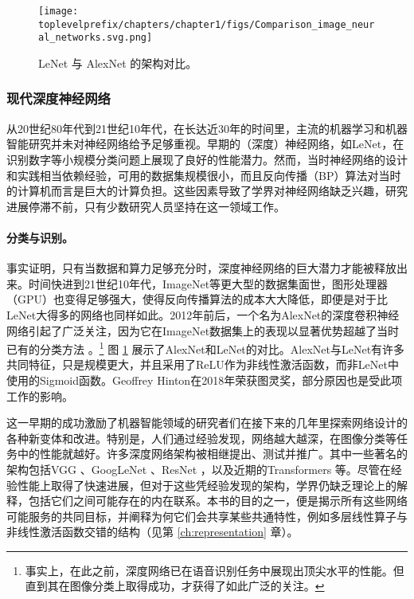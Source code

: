 \documentclass[../../book-main_zh.tex]{subfiles}
\begin{document}
\begin{figure}
    \centering
    \texttt{[image: \\toplevelprefix/chapters/chapter1/figs/Comparison\_image\_neural\_networks.svg.png]}
    \caption{LeNet \cite{LeCun-1989} 与 AlexNet \cite{krizhevsky2012imagenet} 的架构对比。}
    \label{fig:LeNet-AlexNet}
\end{figure}


\subsubsection{现代深度神经网络}
从20世纪80年代到21世纪10年代，在长达近30年的时间里，主流的机器学习和机器智能研究并未对神经网络给予足够重视。早期的（深度）神经网络，如LeNet，在识别数字等小规模分类问题上展现了良好的性能潜力。然而，当时神经网络的设计和实践相当依赖经验，可用的数据集规模很小，而且反向传播（BP）算法对当时的计算机而言是巨大的计算负担。这些因素导致了学界对神经网络缺乏兴趣，研究进展停滞不前，只有少数研究人员坚持在这一领域工作。

\paragraph{分类与识别。}
事实证明，只有当数据和算力足够充分时，深度神经网络的巨大潜力才能被释放出来。时间快进到21世纪10年代，ImageNet等更大型的数据集面世，图形处理器（GPU）也变得足够强大，使得反向传播算法的成本大大降低，即便是对于比LeNet大得多的网络也同样如此。2012年前后，一个名为AlexNet的深度卷积神经网络引起了广泛关注，因为它在ImageNet数据集上的表现以显著优势超越了当时已有的分类方法 \cite{krizhevsky2012imagenet}。\footnote{事实上，在此之前，深度网络已在语音识别任务中展现出顶尖水平的性能。但直到其在图像分类上取得成功，才获得了如此广泛的关注。} 图 \ref{fig:LeNet-AlexNet} 展示了AlexNet和LeNet的对比。AlexNet与LeNet有许多共同特征，只是规模更大，并且采用了ReLU作为非线性激活函数，而非LeNet中使用的Sigmoid函数。Geoffrey Hinton在2018年荣获图灵奖，部分原因也是受此项工作的影响。

这一早期的成功激励了机器智能领域的研究者们在接下来的几年里探索网络设计的各种新变体和改进。特别是，人们通过经验发现，网络越大越深，在图像分类等任务中的性能就越好。许多深度网络架构被相继提出、测试并推广。其中一些著名的架构包括VGG \cite{Simonyan15}、GoogLeNet \cite{Szegedy2014GoingDW}、ResNet \cite{He2016-lc}，以及近期的Transformers \cite{vaswani2017attention} 等。尽管在经验性能上取得了快速进展，但对于这些凭经验发现的架构，学界仍缺乏理论上的解释，包括它们之间可能存在的内在联系。本书的目的之一，便是揭示所有这些网络可能服务的共同目标，并阐释为何它们会共享某些共通特性，例如多层线性算子与非线性激活函数交错的结构（见第 \ref{ch:representation} 章）。
\end{document}

